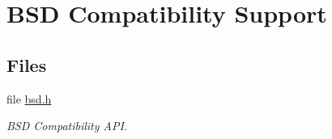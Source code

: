 \hypertarget{group__RTEMSAPIBSD}{}\section{B\+SD Compatibility Support}
\label{group__RTEMSAPIBSD}
\subsection*{Files}
\begin{DoxyCompactItemize}
\item 
file \mbox{\hyperlink{bsd_8h}{bsd.\+h}}
\begin{DoxyCompactList}\small\item\em B\+SD Compatibility A\+PI. \end{DoxyCompactList}\end{DoxyCompactItemize}
